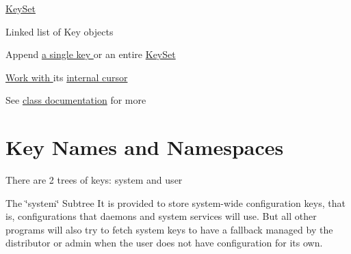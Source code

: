 \hyperlink{group__keyset}{KeySet }
\begin{DoxyItemize}
\item Linked list of Key objects
\item Append \hyperlink{group__keyset_gaa5a1d467a4d71041edce68ea7748ce45}{a single key } or an entire \hyperlink{group__keyset_ga21eb9c3a14a604ee3a8bdc779232e7b7}{KeySet }
\item \hyperlink{group__keyset_ga317321c9065b5a4b3e33fe1c399bcec9}{Work with } its \hyperlink{group__keyset_ga4287b9416912c5f2ab9c195cb74fb094}{internal cursor }
\item See \hyperlink{group__keyset}{class documentation} for more
\end{DoxyItemize}\hypertarget{index_keynames}{}\section{Key Names and Namespaces}\label{index_keynames}
There are 2 trees of keys: {\ttfamily system} and {\ttfamily user} 


\begin{DoxyItemize}
\item The \char`\"{}system\char`\"{} Subtree It is provided to store system-\/wide configuration keys, that is, configurations that daemons and system services will use. But all other programs will also try to fetch system keys to have a fallback managed by the distributor or admin when the user does not have configuration for its own.
\end{DoxyItemize}


